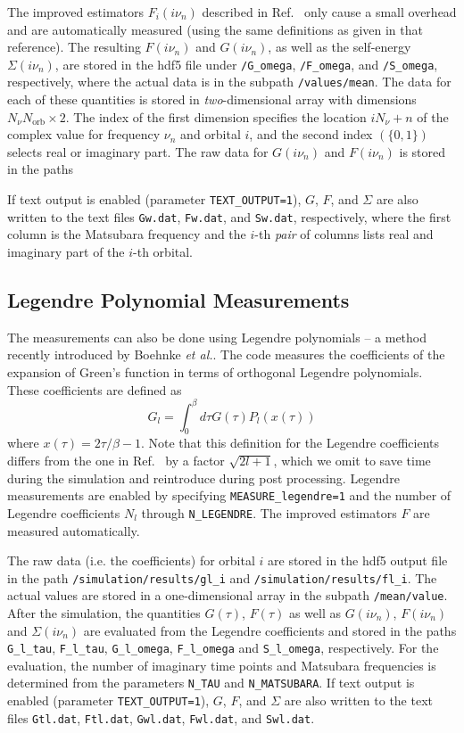 \documentclass[aps,prb,floatfix,superscriptaddress,twocolumn,notitlepage]{revtex4-1}
\newcommand{\iom}{{\ensuremath{i\nu}}}
\begin{document}
The improved estimators $F_{i}(\iom_n)$ described in Ref.~ only cause a small overhead and are automatically measured (using the same definitions as given in that reference). The resulting $F(\iom_n)$ and $G(\iom_n)$, as well as the self-energy $\Sigma(\iom_n)$, are stored in the hdf5 file under \verb#/G_omega#, \verb#/F_omega#, and \verb#/S_omega#, respectively, where the actual data is in the subpath \verb#/values/mean#. The data for each of these quantities is stored in \emph{two}-dimensional array with dimensions $N_{\nu}N_{\text{orb}}\times 2$. The index of the first dimension specifies the location $i N_{\nu}+n$ of the complex value for frequency $\nu_{n}$ and orbital $i$, and the second index $(\{0,1\})$ selects real or imaginary part.
The raw data for $G(\iom_{n})$ and $F(\iom_{n})$ is stored in the paths

If text output is enabled (parameter \verb#TEXT_OUTPUT=1#), $G$, $F$, and $\Sigma$ are also written to the text files \verb#Gw.dat#, \verb#Fw.dat#, and \verb#Sw.dat#, respectively, where the first column is the Matsubara frequency and the $i$-th \emph{pair} of columns lists real and imaginary part of the $i$-th orbital.

\subsection{Legendre Polynomial Measurements}
The measurements can also be done using Legendre polynomials -- a method recently introduced by Boehnke {\it et al.}\cite{Boehnke11}.
The code measures the coefficients of the expansion of Green's function in terms of orthogonal Legendre polynomials. These coefficients are defined as
\begin{equation}
G_{l} = \int_{0}^{\beta}d\tau G(\tau) P_{l}(x(\tau)) 
\end{equation}
where $x(\tau)=2\tau/\beta -1$. Note that this definition for the Legendre coefficients differs from the one in Ref.~ by a factor $\sqrt{2l+1}$, which we omit to save time during the simulation and reintroduce during post processing.
Legendre measurements are enabled by specifying \verb#MEASURE_legendre=1# and the number of Legendre coefficients $N_{l}$ through \verb#N_LEGENDRE#. 
The improved estimators $F$ \cite{Hafermann12} are measured automatically.

The raw data (i.e. the coefficients) for orbital $i$ are stored in the hdf5 output file in the path \verb#/simulation/results/gl_i# and \verb#/simulation/results/fl_i#. The actual values are stored in a one-dimensional array in the subpath \verb#/mean/value#. After the simulation, the quantities $G(\tau)$, $F(\tau)$ as well as $G(\iom_{n})$, $F(\iom_{n})$ and $\Sigma(\iom_{n})$ are evaluated from the Legendre coefficients and stored in the paths \verb#G_l_tau#, \verb#F_l_tau#, \verb#G_l_omega#, \verb#F_l_omega# and \verb#S_l_omega#, respectively. For the evaluation, the number of imaginary time points and Matsubara frequencies is determined from the parameters \verb#N_TAU# and \verb#N_MATSUBARA#.
If text output is enabled (parameter \verb#TEXT_OUTPUT=1#), $G$, $F$, and $\Sigma$ are also written to the text files \verb#Gtl.dat#, \verb#Ftl.dat#, \verb#Gwl.dat#, \verb#Fwl.dat#, and \verb#Swl.dat#.
\end{document}
